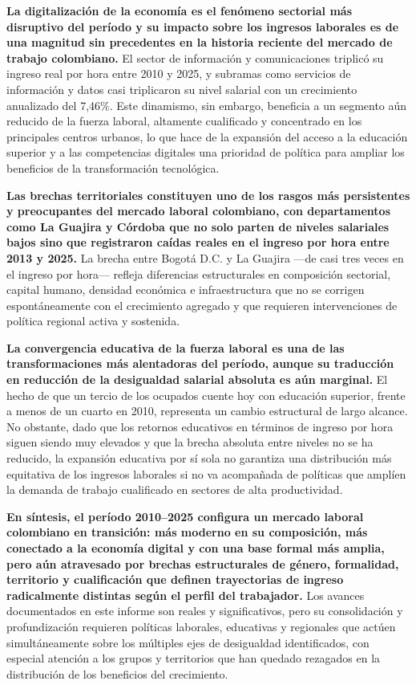 \textbf{La digitalización de la economía es el fenómeno sectorial más disruptivo del período y su impacto sobre los ingresos laborales es de una magnitud sin precedentes en la historia reciente del mercado de trabajo colombiano.} El sector de información y comunicaciones triplicó su ingreso real por hora entre 2010 y 2025, y subramas como servicios de información y datos casi triplicaron su nivel salarial con un crecimiento anualizado del 7,46\%. Este dinamismo, sin embargo, beneficia a un segmento aún reducido de la fuerza laboral, altamente cualificado y concentrado en los principales centros urbanos, lo que hace de la expansión del acceso a la educación superior y a las competencias digitales una prioridad de política para ampliar los beneficios de la transformación tecnológica.

\textbf{Las brechas territoriales constituyen uno de los rasgos más persistentes y preocupantes del mercado laboral colombiano, con departamentos como La Guajira y Córdoba que no solo parten de niveles salariales bajos sino que registraron caídas reales en el ingreso por hora entre 2013 y 2025.} La brecha entre Bogotá D.C. y La Guajira ---de casi tres veces en el ingreso por hora--- refleja diferencias estructurales en composición sectorial, capital humano, densidad económica e infraestructura que no se corrigen espontáneamente con el crecimiento agregado y que requieren intervenciones de política regional activa y sostenida.

\textbf{La convergencia educativa de la fuerza laboral es una de las transformaciones más alentadoras del período, aunque su traducción en reducción de la desigualdad salarial absoluta es aún marginal.} El hecho de que un tercio de los ocupados cuente hoy con educación superior, frente a menos de un cuarto en 2010, representa un cambio estructural de largo alcance. No obstante, dado que los retornos educativos en términos de ingreso por hora siguen siendo muy elevados y que la brecha absoluta entre niveles no se ha reducido, la expansión educativa por sí sola no garantiza una distribución más equitativa de los ingresos laborales si no va acompañada de políticas que amplíen la demanda de trabajo cualificado en sectores de alta productividad.

\textbf{En síntesis, el período 2010--2025 configura un mercado laboral colombiano en transición: más moderno en su composición, más conectado a la economía digital y con una base formal más amplia, pero aún atravesado por brechas estructurales de género, formalidad, territorio y cualificación que definen trayectorias de ingreso radicalmente distintas según el perfil del trabajador.} Los avances documentados en este informe son reales y significativos, pero su consolidación y profundización requieren políticas laborales, educativas y regionales que actúen simultáneamente sobre los múltiples ejes de desigualdad identificados, con especial atención a los grupos y territorios que han quedado rezagados en la distribución de los beneficios del crecimiento.
